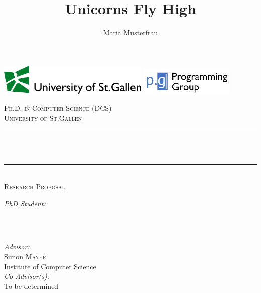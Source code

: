 \documentclass[a4paper,11pt]{article}
\author{Maria Musterfrau}
\title{Unicorns Fly High}
\begin{document}
\begin{titlepage}

\newcommand{\HRule}{\rule{\linewidth}{0.5mm}}
\setlength{\topmargin}{0in}
\center
\includegraphics[height=1.5cm]{logos/hsg.pdf}
\hfill
\includegraphics[height=1.3cm,trim=0 4mm 0 4mm]{logos/prg-grp.pdf}


\vfill
\textsc{\Large Ph.D. in Computer Science (DCS)} \\[0.5cm]
\textsc{\LARGE University of St.Gallen}\\[2.0cm]


\HRule \\[0.6cm]
{ \huge \bfseries \thetitle}\\[0.4cm]
\HRule \\[0.4cm]

\textsc{\Large Research Proposal}
\vfill


\begin{minipage}{0.4\textwidth}
\begin{flushleft} \large
\emph{PhD Student:}\\
\theauthor \\ 
\end{flushleft}
\end{minipage}
~
\begin{minipage}{0.5\textwidth}
\begin{flushright} \large
\emph{Advisor:} \\
Simon \textsc{Mayer} \\
Institute of Computer Science\\[0.5cm]
\emph{Co-Advisor(s):} \\
To be determined
\end{flushright}
\end{minipage}\\[2cm]


\end{titlepage}
\end{document}
